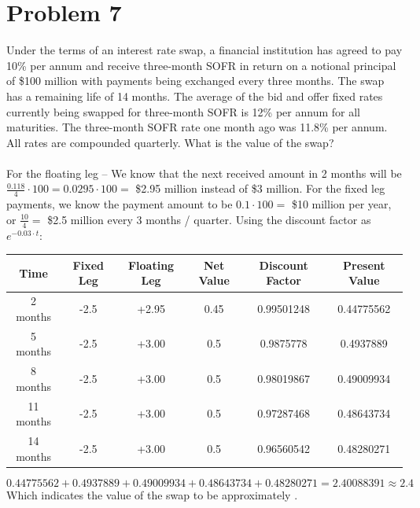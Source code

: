 \documentclass{article}
\begin{document}
{\Large 

\section*{Problem 7}
Under the terms of an interest rate swap, a financial institution has agreed to pay 10\% per annum and receive three-month SOFR in return on a notional principal of \$100 million with payments being exchanged every three months. The swap has a remaining life of 14 months. The average of the bid and offer fixed rates currently being swapped for three-month SOFR is 12\% per annum for all maturities. The three-month SOFR rate one month ago was 11.8\% per annum. All rates are compounded quarterly. What is the value of the swap? \\ \\
For the floating leg -- We know that the next received amount in 2 months will be \(\frac{0.118}{4} \cdot 100 = 0.0295 \cdot 100 = \) \$2.95 million instead of \$3 million. For the fixed leg payments, we know the payment amount to be \(0.1 \cdot 100 = \) \$10 million per year, or \(\frac{10}{4} = \) \$2.5 million every 3 months / quarter. Using the discount factor as \(e^{-0.03 \cdot t}\):
\begin{center}
\begin{tabular}{ |c|c|c|c|c|c| } 
 \hline
 Time & Fixed Leg & Floating Leg & Net Value & Discount Factor & Present Value \\ 
 \hline
 2 months & -2.5 & +2.95 & 0.45 & 0.99501248 & 0.44775562 \\ 
 \hline
 5 months & -2.5 & +3.00 & 0.5 & 0.9875778 & 0.4937889 \\ 
 \hline
 8 months & -2.5 & +3.00 & 0.5 & 0.98019867 & 0.49009934 \\ 
 \hline
 11 months & -2.5 & +3.00 & 0.5 & 0.97287468 & 0.48643734 \\ 
 \hline
 14 months & -2.5 & +3.00 & 0.5 & 0.96560542 & 0.48280271 \\ 
 \hline
\end{tabular}
\end{center}
\[
  0.44775562 + 0.4937889 + 0.49009934 + 0.48643734 + 0.48280271 = 2.40088391 \approx 2.4 
\]
Which indicates the value of the swap to be approximately .

}
\end{document}
